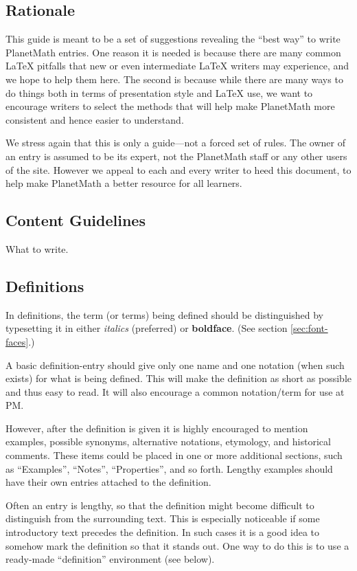 
\subsection*{Rationale}

This guide is meant to be a set of suggestions revealing the ``best way'' to write PlanetMath entries. One reason it is needed is because there are many common \LaTeX{} pitfalls that new or even intermediate \LaTeX{} writers may experience, and we hope to help them here. The second is because while there are many ways to do things both in terms of presentation style and \LaTeX{} use, we want to encourage writers to select the methods that will help make PlanetMath more consistent and hence easier to understand.

We stress again that this is only a guide---not a forced set of rules. The owner of an entry is assumed to be its expert, not the PlanetMath staff or any other users of the site. However we appeal to each and every writer to heed this document, to help make PlanetMath a better resource for all learners.

\subsection*{Content Guidelines}

What to write.

\subsection{Definitions}

In definitions, the term (or terms) being defined should be distinguished by typesetting it in either \emph{italics} (preferred) or \textbf{boldface}.
(See section \ref{sec:font-faces}.)

A basic definition-entry should give only one name and one notation (when such exists) for what is being defined. This will make the definition as short as possible and thus easy to read. It will also encourage a common notation/term for use at PM.

However, after the definition is given it is highly encouraged to mention examples, possible synonyms, alternative notations, etymology, and historical comments. These items could be placed in one or more additional sections, such as ``Examples'', ``Notes'',
``Properties'', and so forth. Lengthy examples should have their own entries attached to the definition.

Often an entry is lengthy, so that the definition might become difficult to distinguish from the surrounding text. This is especially noticeable if some introductory text precedes the definition. In such cases it is a good idea to somehow mark the definition so that it stands out. One way to do this is to use a ready-made ``definition'' environment (see below).

